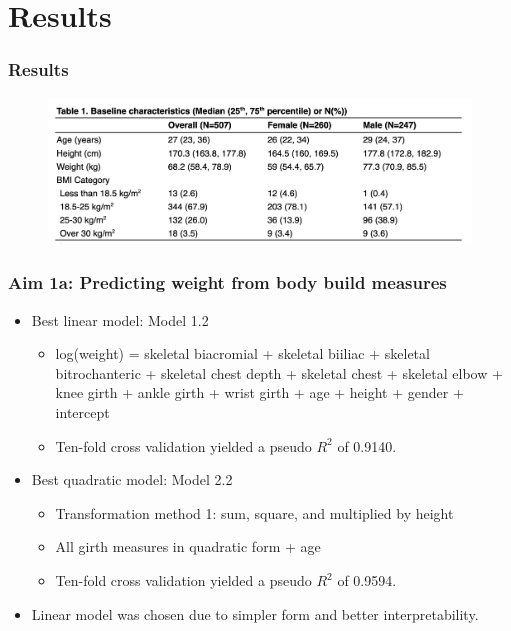 \documentclass{beamer}
\begin{document}
\section{Results}

\begin{frame}
\frametitle{Results}

\begin{figure}
	\includegraphics[scale=0.35]{Table1.png}
	\label{fig:table1}
\end{figure}

\end{frame}

\begin{frame}
\frametitle{Aim 1a: Predicting weight from body build measures}
 
\begin{itemize}
	\item Best linear model: Model 1.2
		\begin{itemize}
			\item log(weight) = skeletal biacromial + skeletal biiliac + skeletal bitrochanteric + skeletal chest depth + skeletal chest + skeletal elbow + knee girth + ankle girth + wrist girth + age + height + gender + intercept 
			\item Ten-fold cross validation yielded a pseudo $R^2$ of 0.9140.
		\end{itemize}
	\item Best quadratic model: Model 2.2
		\begin{itemize}
			\item Transformation method 1: sum, square, and multiplied by height
			\item All girth measures in quadratic form + age
			\item Ten-fold cross validation yielded a pseudo $R^2$ of 0.9594.
		\end{itemize}
	\item Linear model was chosen due to simpler form and better interpretability.  
\end{itemize}

\end{frame}
\end{document}
